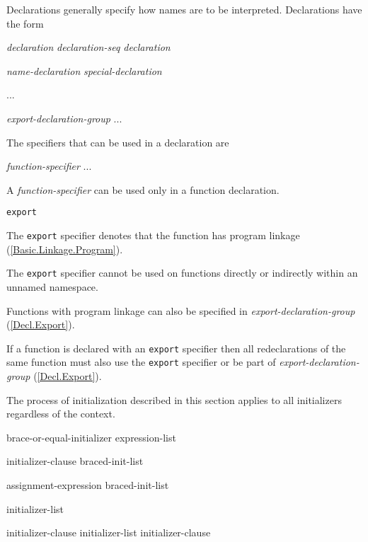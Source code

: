 \p Declarations generally specify how names are to be interpreted. Declarations have the form
\begin{grammar}
  \br
  \textit{declaration}\br
  \textit{declaration-seq declaration}

  \br
  \textit{name-declaration}\br
  \textit{special-declaration}

  \br
  ...

  \br
  \textit{export-declaration-group}\br
  ...
\end{grammar}

\p The specifiers that can be used in a declaration are
\begin{grammar}
  \br
  \textit{function-specifier}\br
  ...
\end{grammar}


\p A \textit{function-specifier} can be used only in a function declaration.

\begin{grammar}
  \br
  \texttt{export}\br
\end{grammar}

\p The \texttt{export} specifier denotes that the function has program linkage (\ref{Basic.Linkage.Program}).

\p The \texttt{export} specifier cannot be used on functions directly or indirectly within an unnamed namespace.

\p Functions with program linkage can also be specified in \textit{export-declaration-group} (\ref{Decl.Export}).

\p If a function is declared with an \texttt{export} specifier then all redeclarations of the same function must also use the \texttt{export} specifier or be part of \textit{export-declaration-group} (\ref{Decl.Export}).


\p The process of initialization described in this section applies to all
initializers regardless of the context.

\begin{grammar}
  \br
  brace-or-equal-initializer\br
  \terminal{(} expression-list \terminal{)}\br

  \br
  \terminal{=} initializer-clause\br
  braced-init-list\br

  \br
  assignment-expression\br
  braced-init-list\br

  \br
  \terminal{\{} initializer-list \opt{\terminal{,}} \terminal{\}}\br
  \terminal{\{} \terminal{\}}\br

  \br
  initializer-clause\br
  initializer-list \terminal{,} initializer-clause\br
\end{grammar}

